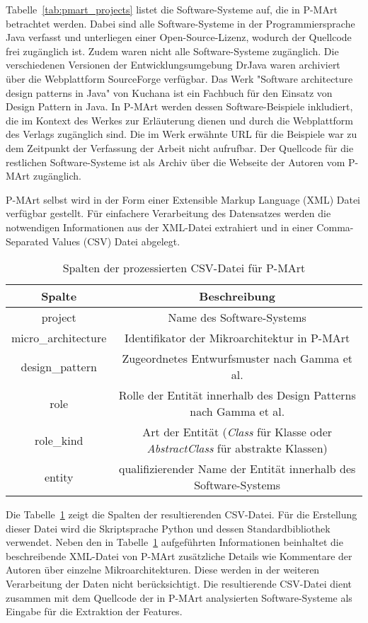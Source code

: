 Tabelle~\ref{tab:pmart_projects} listet die Software-Systeme auf, die in P-MArt betrachtet werden. Dabei sind alle Software-Systeme in der Programmiersprache Java verfasst und unterliegen einer Open-Source-Lizenz, wodurch der Quellcode frei zugänglich ist.
Zudem waren nicht alle Software-Systeme zugänglich. Die verschiedenen Versionen der Entwicklungsumgebung DrJava waren archiviert über die Webplattform SourceForge verfügbar. Das Werk "Software architecture design patterns in Java" von Kuchana ist ein Fachbuch für den Einsatz von Design Pattern in Java. 
In P-MArt werden dessen Software-Beispiele inkludiert, die im Kontext des Werkes zur Erläuterung dienen und durch die Webplattform des Verlags zugänglich sind. Die im Werk erwähnte URL für die Beispiele war zu dem Zeitpunkt der Verfassung der Arbeit nicht aufrufbar.
Der Quellcode für die restlichen Software-Systeme ist als Archiv über die Webseite der Autoren vom P-MArt zugänglich.

P-MArt selbst wird in der Form einer Extensible Markup Language (XML) Datei verfügbar gestellt. Für einfachere Verarbeitung des Datensatzes werden die notwendigen Informationen aus der XML-Datei extrahiert und in einer Comma-Separated Values (CSV) Datei abgelegt.
\begin{table}[H]
    \centering
    \begin{tabular}{|c|c|}
        \hline
        Spalte & Beschreibung\\
        \hline
        project & Name des Software-Systems\\
        micro\_architecture & Identifikator der Mikroarchitektur in P-MArt\\
        design\_pattern & Zugeordnetes Entwurfsmuster nach Gamma et al.\\
        role & Rolle der Entität innerhalb des Design Patterns nach Gamma et al.\\
        role\_kind & Art der Entität (\textit{Class} für Klasse oder \textit{AbstractClass} für abstrakte Klassen)\\
        entity & qualifizierender Name der Entität innerhalb des Software-Systems\\
        \hline
    \end{tabular}
    \caption{Spalten der prozessierten CSV-Datei für P-MArt}
    \label{tab:pmart_roles}
\end{table}

Die Tabelle~\ref{tab:pmart_roles} zeigt die Spalten der resultierenden CSV-Datei. Für die Erstellung dieser Datei wird die Skriptsprache Python und dessen Standardbibliothek verwendet.
Neben den in Tabelle~\ref{tab:pmart_roles} aufgeführten Informationen beinhaltet die beschreibende XML-Datei von P-MArt zusätzliche Details wie Kommentare der Autoren über einzelne Mikroarchitekturen.
Diese werden in der weiteren Verarbeitung der Daten nicht berücksichtigt. Die resultierende CSV-Datei dient zusammen mit dem Quellcode der in P-MArt analysierten Software-Systeme als Eingabe für die Extraktion der Features.
